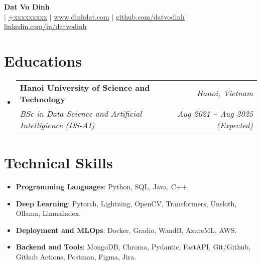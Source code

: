 \documentclass[letterpaper,11pt]{article}
\makeatletter
\newcommand{\resumeitem}[1]{
  \item\small{
    #1 \vspace{-2pt}
  }
}
\newcommand{\resumeSubheading}[4]{
  \vspace{-1pt}\item
    \begin{tabular*}{0.97\textwidth}[t]{l@{\extracolsep{\fill}}r}
      \textbf{#1} & \textit{#2} \\
      \textit{\small#3} & \textit{\small #4} \\
    \end{tabular*}\vspace{-6pt}
}
\newcommand{\resumeSubHeadingListStart}{\begin{itemize}[leftmargin=*,label={}]}
\newcommand{\resumeSubHeadingListEnd}{\end{itemize}}
\newcommand{\resumeItemListStart}{\begin{itemize}}
\newcommand{\resumeItemListEnd}{\end{itemize}\vspace{-5pt}}
\makeatother
\begin{document}

\begin{flushleft}
  \textbf{\huge {Dat Vo Dinh}} \\ \vspace{4pt}
   $|$ \href{tel:+xxxxxxxxx}{{+xxxxxxxxx}} $|$ \href{https://dinhdat.com}{{www.dinhdat.com}}
  $|$ \href{https://github.com/datvodinh/}{{github.com/datvodinh}} $|$ \href{https://linkedin.com/in/datvodinh}{{linkedin.com/in/datvodinh}}
\end{flushleft}

\section{Educations}
  \resumeSubHeadingListStart
    \resumeSubheading
      {Hanoi University of Science and Technology}{\textit{Hanoi, Vietnam}}
      {BSc in Data Science and Artificial Intelligience (DS-AI)}{Aug 2021 -- Aug 2025 (Expected)}
  \resumeSubHeadingListEnd

  
\section{Technical Skills}
\resumeItemListStart[leftmargin=*,label={}]
  \resumeitem{\textbf{Programming Languages}: {Python, SQL, Java, C++.}} \\[-\baselineskip]
  \resumeitem{\textbf{Deep Learning}: {Pytorch, Lightning, OpenCV, Transformers, Unsloth, Ollama, LlamaIndex.}} \\[-\baselineskip]
  \resumeitem{\textbf{Deployment and MLOps}: {Docker, Gradio, WandB, AzureML, AWS.}} \\[-\baselineskip]
  \resumeitem{\textbf{Backend and Tools}: {MongoDB, Chroma, Pydantic, FastAPI, Git/Github, Github Actions, Postman, Figma, Jira.}} \\[-\baselineskip]
\resumeItemListEnd
\end{document}

